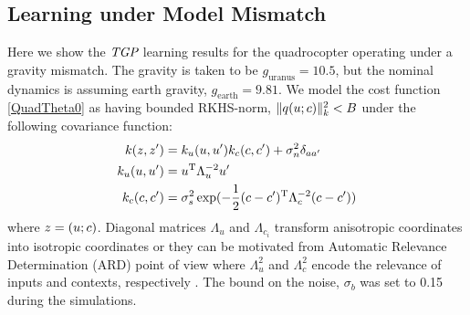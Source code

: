 \subsection{Learning under Model Mismatch}

%


Here we show the $\emph{TGP}$ learning results for the quadrocopter operating under a gravity mismatch. The gravity is taken to be $g_{\mathrm{uranus}} = 10.5$, but the nominal dynamics is assuming earth gravity, $g_{\mathrm{earth}} = 9.81$. We model the cost function \eqref{QuadTheta0} as having bounded RKHS-norm, $\|q(u;c)\|_{k}^{2} < B$ under the following covariance function:
\begin{align*}
k(z, z') &= k_u(u, u')k_{c}(c, c') + \sigma_{n}^{2}\delta_{aa'} \\ 
k_u(u, u') &= u^{\mathrm{T}}\Lambda_{u}^{-2}u' \\
k_{c}(c, c') &= \sigma_{s}^{2}\exp(-\frac{1}{2}(c-c')^{\mathrm{T}}\Lambda_{c}^{-2}(c-c'))
\end{align*}
where $z = (u;c)$. Diagonal matrices $\Lambda_{u}$ and $\Lambda_{c_{i}}$ transform anisotropic coordinates into isotropic coordinates or they can be motivated from Automatic Relevance Determination (ARD) point of view where $\Lambda_{u}^{2}$ and $\Lambda_{c}^{2}$ encode the relevance of inputs and contexts, respectively \cite{Rasmussen06}. The bound on the noise, $\sigma_{b}$ was set to 0.15 during the simulations.

